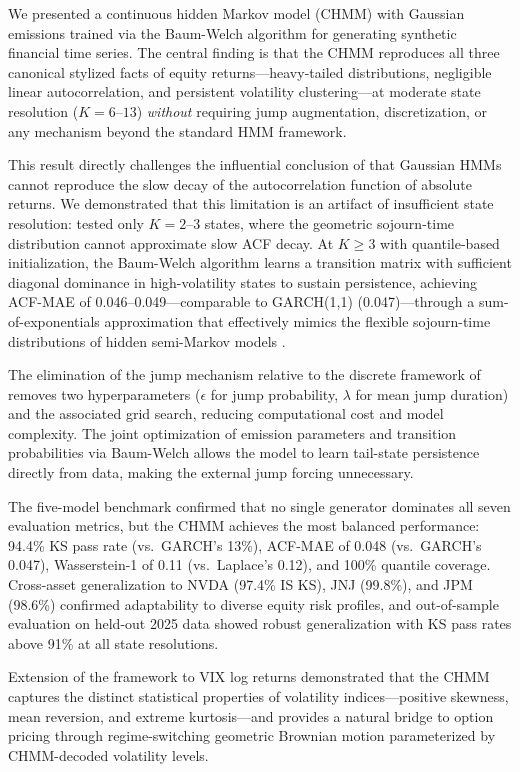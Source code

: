 We presented a continuous hidden Markov model (CHMM) with Gaussian emissions trained via the Baum-Welch algorithm for generating synthetic financial time series.
The central finding is that the CHMM reproduces all three canonical stylized facts of equity returns---heavy-tailed distributions, negligible linear autocorrelation, and persistent volatility clustering---at moderate state resolution ($K = 6$--$13$) \emph{without} requiring jump augmentation, discretization, or any mechanism beyond the standard HMM framework.

This result directly challenges the influential conclusion of \citet{ryden1998stylized} that Gaussian HMMs cannot reproduce the slow decay of the autocorrelation function of absolute returns.
We demonstrated that this limitation is an artifact of insufficient state resolution: \citet{ryden1998stylized} tested only $K = 2$--$3$ states, where the geometric sojourn-time distribution cannot approximate slow ACF decay.
At $K \geq 3$ with quantile-based initialization, the Baum-Welch algorithm learns a transition matrix with sufficient diagonal dominance in high-volatility states to sustain persistence, achieving ACF-MAE of 0.046--0.049---comparable to GARCH(1,1) (0.047)---through a sum-of-exponentials approximation that effectively mimics the flexible sojourn-time distributions of hidden semi-Markov models \citep{bulla2006stylized}.

The elimination of the jump mechanism relative to the discrete framework of \citet{alswaidan2026hybrid} removes two hyperparameters ($\epsilon$ for jump probability, $\lambda$ for mean jump duration) and the associated grid search, reducing computational cost and model complexity.
The joint optimization of emission parameters and transition probabilities via Baum-Welch allows the model to learn tail-state persistence directly from data, making the external jump forcing unnecessary.

The five-model benchmark confirmed that no single generator dominates all seven evaluation metrics, but the CHMM achieves the most balanced performance: 94.4\% KS pass rate (vs.\ GARCH's 13\%), ACF-MAE of 0.048 (vs.\ GARCH's 0.047), Wasserstein-1 of 0.11 (vs.\ Laplace's 0.12), and 100\% quantile coverage.
Cross-asset generalization to NVDA (97.4\% IS KS), JNJ (99.8\%), and JPM (98.6\%) confirmed adaptability to diverse equity risk profiles, and out-of-sample evaluation on held-out 2025 data showed robust generalization with KS pass rates above 91\% at all state resolutions.

Extension of the framework to VIX log returns demonstrated that the CHMM captures the distinct statistical properties of volatility indices---positive skewness, mean reversion, and extreme kurtosis---and provides a natural bridge to option pricing through regime-switching geometric Brownian motion parameterized by CHMM-decoded volatility levels.

